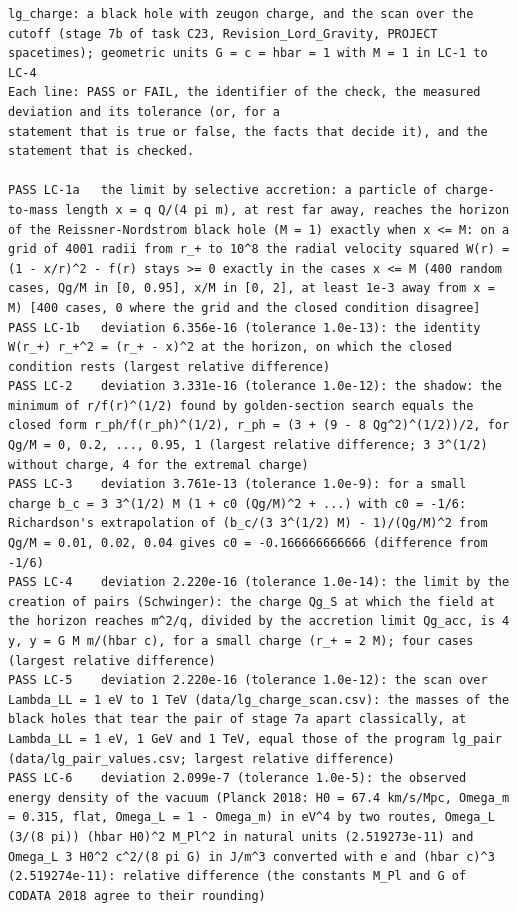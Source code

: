 \documentclass[
  10pt,
]{article}
\begin{document}
\begin{verbatim}
lg_charge: a black hole with zeugon charge, and the scan over the cutoff (stage 7b of task C23, Revision_Lord_Gravity, PROJECT spacetimes); geometric units G = c = hbar = 1 with M = 1 in LC-1 to LC-4
Each line: PASS or FAIL, the identifier of the check, the measured deviation and its tolerance (or, for a
statement that is true or false, the facts that decide it), and the statement that is checked.

PASS LC-1a   the limit by selective accretion: a particle of charge-to-mass length x = q Q/(4 pi m), at rest far away, reaches the horizon of the Reissner-Nordstrom black hole (M = 1) exactly when x <= M: on a grid of 4001 radii from r_+ to 10^8 the radial velocity squared W(r) = (1 - x/r)^2 - f(r) stays >= 0 exactly in the cases x <= M (400 random cases, Qg/M in [0, 0.95], x/M in [0, 2], at least 1e-3 away from x = M) [400 cases, 0 where the grid and the closed condition disagree]
PASS LC-1b   deviation 6.356e-16 (tolerance 1.0e-13): the identity W(r_+) r_+^2 = (r_+ - x)^2 at the horizon, on which the closed condition rests (largest relative difference)
PASS LC-2    deviation 3.331e-16 (tolerance 1.0e-12): the shadow: the minimum of r/f(r)^(1/2) found by golden-section search equals the closed form r_ph/f(r_ph)^(1/2), r_ph = (3 + (9 - 8 Qg^2)^(1/2))/2, for Qg/M = 0, 0.2, ..., 0.95, 1 (largest relative difference; 3 3^(1/2) without charge, 4 for the extremal charge)
PASS LC-3    deviation 3.761e-13 (tolerance 1.0e-9): for a small charge b_c = 3 3^(1/2) M (1 + c0 (Qg/M)^2 + ...) with c0 = -1/6: Richardson's extrapolation of (b_c/(3 3^(1/2) M) - 1)/(Qg/M)^2 from Qg/M = 0.01, 0.02, 0.04 gives c0 = -0.166666666666 (difference from -1/6)
PASS LC-4    deviation 2.220e-16 (tolerance 1.0e-14): the limit by the creation of pairs (Schwinger): the charge Qg_S at which the field at the horizon reaches m^2/q, divided by the accretion limit Qg_acc, is 4 y, y = G M m/(hbar c), for a small charge (r_+ = 2 M); four cases (largest relative difference)
PASS LC-5    deviation 2.220e-16 (tolerance 1.0e-12): the scan over Lambda_LL = 1 eV to 1 TeV (data/lg_charge_scan.csv): the masses of the black holes that tear the pair of stage 7a apart classically, at Lambda_LL = 1 eV, 1 GeV and 1 TeV, equal those of the program lg_pair (data/lg_pair_values.csv; largest relative difference)
PASS LC-6    deviation 2.099e-7 (tolerance 1.0e-5): the observed energy density of the vacuum (Planck 2018: H0 = 67.4 km/s/Mpc, Omega_m = 0.315, flat, Omega_L = 1 - Omega_m) in eV^4 by two routes, Omega_L (3/(8 pi)) (hbar H0)^2 M_Pl^2 in natural units (2.519273e-11) and Omega_L 3 H0^2 c^2/(8 pi G) in J/m^3 converted with e and (hbar c)^3 (2.519274e-11): relative difference (the constants M_Pl and G of CODATA 2018 agree to their rounding)


\end{verbatim}
\end{document}
